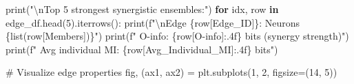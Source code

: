 \documentclass[
  11pt,
  letterpaper,
  oneside,
  openany]{book}
\newenvironment{Shaded}{\begin{snugshade}}{\end{snugshade}}
\newcommand{\BuiltInTok}[1]{\textcolor[rgb]{0.00,0.23,0.31}{#1}}
\newcommand{\CharTok}[1]{\textcolor[rgb]{0.13,0.47,0.30}{#1}}
\newcommand{\CommentTok}[1]{\textcolor[rgb]{0.37,0.37,0.37}{#1}}
\newcommand{\ControlFlowTok}[1]{\textcolor[rgb]{0.00,0.23,0.31}{\textbf{#1}}}
\newcommand{\DecValTok}[1]{\textcolor[rgb]{0.68,0.00,0.00}{#1}}
\newcommand{\KeywordTok}[1]{\textcolor[rgb]{0.00,0.23,0.31}{\textbf{#1}}}
\newcommand{\NormalTok}[1]{\textcolor[rgb]{0.00,0.23,0.31}{#1}}
\newcommand{\OperatorTok}[1]{\textcolor[rgb]{0.37,0.37,0.37}{#1}}
\newcommand{\SpecialCharTok}[1]{\textcolor[rgb]{0.37,0.37,0.37}{#1}}
\newcommand{\SpecialStringTok}[1]{\textcolor[rgb]{0.13,0.47,0.30}{#1}}
\newcommand{\StringTok}[1]{\textcolor[rgb]{0.13,0.47,0.30}{#1}}
\begin{document}
\begin{Shaded}
\begin{Highlighting}[]
\BuiltInTok{print}\NormalTok{(}\StringTok{"}\CharTok{\textbackslash{}n}\StringTok{Top 5 strongest synergistic ensembles:"}\NormalTok{)}
\ControlFlowTok{for}\NormalTok{ idx, row }\KeywordTok{in}\NormalTok{ edge\_df.head(}\DecValTok{5}\NormalTok{).iterrows():}
    \BuiltInTok{print}\NormalTok{(}\SpecialStringTok{f"}\CharTok{\textbackslash{}n}\SpecialStringTok{Edge }\SpecialCharTok{\{}\NormalTok{row[}\StringTok{\textquotesingle{}Edge\_ID\textquotesingle{}}\NormalTok{]}\SpecialCharTok{\}}\SpecialStringTok{: Neurons }\SpecialCharTok{\{}\BuiltInTok{list}\NormalTok{(row[}\StringTok{\textquotesingle{}Members\textquotesingle{}}\NormalTok{])}\SpecialCharTok{\}}\SpecialStringTok{"}\NormalTok{)}
    \BuiltInTok{print}\NormalTok{(}\SpecialStringTok{f"  O{-}info: }\SpecialCharTok{\{}\NormalTok{row[}\StringTok{\textquotesingle{}O{-}info\textquotesingle{}}\NormalTok{]}\SpecialCharTok{:.4f\}}\SpecialStringTok{ bits (synergy strength)"}\NormalTok{)}
    \BuiltInTok{print}\NormalTok{(}\SpecialStringTok{f"  Avg individual MI: }\SpecialCharTok{\{}\NormalTok{row[}\StringTok{\textquotesingle{}Avg\_Individual\_MI\textquotesingle{}}\NormalTok{]}\SpecialCharTok{:.4f\}}\SpecialStringTok{ bits"}\NormalTok{)}

\CommentTok{\# Visualize edge properties}
\NormalTok{fig, (ax1, ax2) }\OperatorTok{=}\NormalTok{ plt.subplots(}\DecValTok{1}\NormalTok{, }\DecValTok{2}\NormalTok{, figsize}\OperatorTok{=}\NormalTok{(}\DecValTok{14}\NormalTok{, }\DecValTok{5}\NormalTok{))}


\end{Highlighting}
\end{Shaded}
\end{document}
